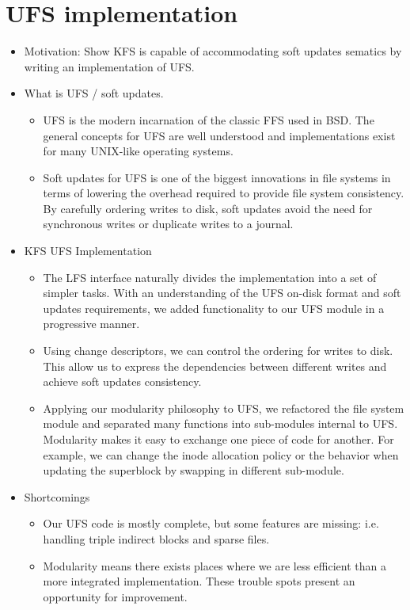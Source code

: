 \section{UFS implementation}
\label{sec:ufs}

\begin{itemize}
\item Motivation: Show KFS is capable of accommodating soft updates
  sematics by writing an implementation of UFS.
\item What is UFS / soft updates.
  \begin{itemize}
  \item UFS is the modern incarnation of the classic FFS used in BSD.
    The general concepts for UFS are well understood and implementations
    exist for many UNIX-like operating systems.
  \item Soft updates for UFS is one of the biggest innovations in file
    systems in terms of lowering the overhead required to provide file
    system consistency. By carefully ordering writes to disk, soft updates
    avoid the need for synchronous writes or duplicate writes to a journal.
  \end{itemize}
\item KFS UFS Implementation
  \begin{itemize}
  \item The LFS interface naturally divides the implementation into a set
    of simpler tasks. With an understanding of the UFS on-disk format and
    soft updates requirements, we added functionality to our UFS module
    in a progressive manner.
  \item Using change descriptors, we can control the ordering for writes
    to disk. This allow us to express the dependencies between different
    writes and achieve soft updates consistency.
  \item Applying our modularity philosophy to UFS, we refactored the file
    system module and separated many functions into sub-modules internal
    to UFS. Modularity makes it easy to exchange one piece of code for
    another. For example, we can change the inode allocation policy or
    the behavior when updating the superblock by swapping in different
    sub-module.
  \end{itemize}
\item Shortcomings
  \begin{itemize}
  \item Our UFS code is mostly complete, but some features are missing:
    i.e. handling triple indirect blocks and sparse files.
  \item Modularity means there exists places where we are less efficient
    than a more integrated implementation. These trouble spots present
    an opportunity for improvement.
  \end{itemize}
\end{itemize}
